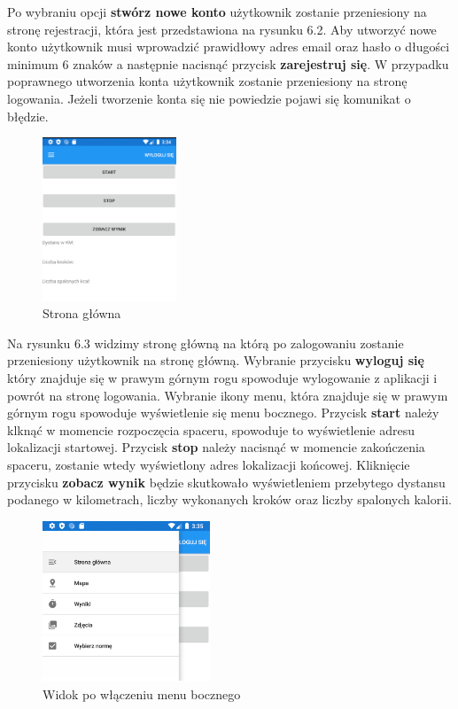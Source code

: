 Po wybraniu opcji \textbf{stwórz nowe konto} użytkownik zostanie przeniesiony na stronę rejestracji, która jest przedstawiona na rysunku 6.2.
Aby utworzyć nowe konto użytkownik musi wprowadzić prawidłowy adres email oraz hasło o długości minimum 6 znaków a następnie nacisnąć przycisk \textbf{zarejestruj się}. W przypadku poprawnego utworzenia konta użytkownik zostanie przeniesiony na stronę logowania. Jeżeli tworzenie konta się nie powiedzie pojawi się komunikat o błędzie. 


\begin{figure}[!htb]
	\begin{center}
		\includegraphics[width=4cm]{rys/glowna_empty.png}
		\caption{Strona główna}
		\label{rys:rysunek043}
	\end{center}
\end{figure}

Na rysunku 6.3 widzimy stronę główną na którą po zalogowaniu zostanie przeniesiony użytkownik na stronę główną. Wybranie przycisku \textbf{wyloguj się} który znajduje się w prawym górnym rogu spowoduje wylogowanie z aplikacji i powrót na stronę logowania. Wybranie ikony menu, która znajduje się w prawym górnym rogu spowoduje wyświetlenie się menu bocznego. Przycisk \textbf{start} należy klknąć w momencie rozpoczęcia spaceru, spowoduje to wyświetlenie adresu lokalizacji startowej. Przycisk \textbf{stop} należy nacisnąć w momencie zakończenia spaceru, zostanie wtedy wyświetlony adres lokalizacji końcowej. Kliknięcie przycisku \textbf{zobacz wynik} będzie skutkowało wyświetleniem przebytego dystansu podanego w kilometrach, liczby wykonanych kroków oraz liczby spalonych kalorii.

\begin{figure}[!htb]
	\begin{center}
		\includegraphics[width=5cm]{rys/menu.png}
		\caption{Widok po włączeniu menu bocznego}
		\label{rys:rysunek044}
	\end{center}
\end{figure}

